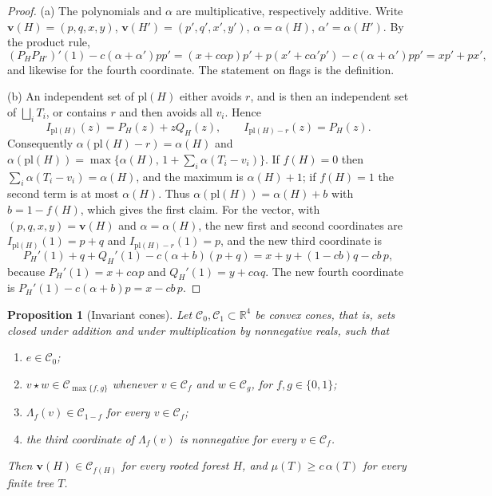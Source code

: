 \documentclass{amsart}
\numberwithin{equation}{section}
\theoremstyle{plain}
\newtheorem{proposition}[theorem]{Proposition}
\theoremstyle{definition}
\theoremstyle{remark}
\newcommand{\R}{\mathbb{R}}
\newcommand{\C}{\mathcal{C}}
\newcommand{\vc}{\mathbf{v}}
\begin{document}
\begin{proof}
(a) The polynomials and $\alpha$ are multiplicative, respectively additive. Write $\vc(H)=(p,q,x,y)$, $\vc(H')=(p',q',x',y')$, $\alpha=\alpha(H)$, $\alpha'=\alpha(H')$. By the product rule,
\[
(P_HP_{H'})'(1)-c(\alpha+\alpha')pp'=(x+c\alpha p)p'+p(x'+c\alpha'p')-c(\alpha+\alpha')pp'=xp'+px',
\]
and likewise for the fourth coordinate. The statement on flags is the definition.

(b) An independent set of $\mathrm{pl}(H)$ either avoids $r$, and is then an independent set of $\bigsqcup_iT_i$, or contains $r$ and then avoids all $v_i$. Hence
\[
I_{\mathrm{pl}(H)}(z)=P_H(z)+zQ_H(z),\qquad I_{\mathrm{pl}(H)-r}(z)=P_H(z).
\]
Consequently $\alpha(\mathrm{pl}(H)-r)=\alpha(H)$ and $\alpha(\mathrm{pl}(H))=\max\{\alpha(H),\,1+\sum_i\alpha(T_i-v_i)\}$. If $f(H)=0$ then $\sum_i\alpha(T_i-v_i)=\alpha(H)$, and the maximum is $\alpha(H)+1$; if $f(H)=1$ the second term is at most $\alpha(H)$. Thus $\alpha(\mathrm{pl}(H))=\alpha(H)+b$ with $b=1-f(H)$, which gives the first claim. For the vector, with $(p,q,x,y)=\vc(H)$ and $\alpha=\alpha(H)$, the new first and second coordinates are $I_{\mathrm{pl}(H)}(1)=p+q$ and $I_{\mathrm{pl}(H)-r}(1)=p$, and the new third coordinate is
\[
P_H'(1)+q+Q_H'(1)-c(\alpha+b)(p+q)=x+y+(1-cb)q-cb\,p,
\]
because $P_H'(1)=x+c\alpha p$ and $Q_H'(1)=y+c\alpha q$. The new fourth coordinate is $P_H'(1)-c(\alpha+b)p=x-cb\,p$.
\end{proof}

\begin{proposition}[Invariant cones]\label{prop:cones}
Let $\C_0,\C_1\subset\R^4$ be convex cones, that is, sets closed under addition and under multiplication by nonnegative reals, such that
\begin{enumerate}[label=\textup{(\roman*)},leftmargin=*]
\item $e\in\C_0$;
\item $v\star w\in\C_{\max\{f,g\}}$ whenever $v\in\C_f$ and $w\in\C_g$, for $f,g\in\{0,1\}$;
\item $\Lambda_f(v)\in\C_{1-f}$ for every $v\in\C_f$;
\item the third coordinate of $\Lambda_f(v)$ is nonnegative for every $v\in\C_f$.
\end{enumerate}
Then $\vc(H)\in\C_{f(H)}$ for every rooted forest $H$, and $\mu(T)\ge c\,\alpha(T)$ for every finite tree $T$.
\end{proposition}
\end{document}
